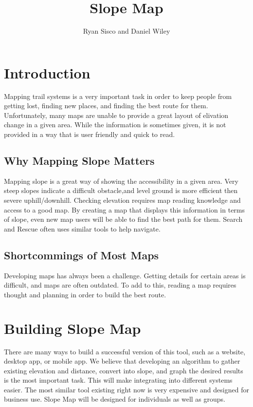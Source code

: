 \documentclass[12pt]{article}
\title{Slope Map}
\author{Ryan Sisco and Daniel Wiley}
\begin{document}
\maketitle
\tableofcontents



\section{Introduction}
Mapping trail systems is a very important task in order to keep people from getting lost, finding new places, and finding the best route for them. Unfortunately, many maps are unable to provide a great layout of elivation change in a given area. While the information is sometimes given, it is not provided in a way that is user friendly and quick to read.
\subsection{Why Mapping Slope Matters}
Mapping slope is a great way of showing the accessibility in a given area. Very steep slopes indicate a difficult obstacle,and level ground is more efficient then severe uphill/downhill\cite{Perrey:2007}. Checking elevation requires map reading knowledge and access to a good map. By creating a map that displays this information in terms of slope, even new map users will be able to find the best path for them. Search and Rescue often uses similar tools to help navigate\cite{Hurst:2017}\cite{Gabbert:2017}\cite{Pfau:2013}.
\subsection{Shortcommings of Most Maps}
Developing maps has always been a challenge. Getting details for certain areas is difficult, and maps are often outdated. To add to this, reading a map requires thought and planning in order to build the best route.

\section{Building Slope Map}
There are many ways to build a successful version of this tool, such as a website, desktop app, or mobile app. We believe that developing an algorithm to gather existing elevation and distance, convert into slope, and graph the desired results is the most important task. This will make integrating into different systems easier. The most similar tool existing right now is very expensive and designed for business use. Slope Map will be designed for individuals as well as groups.
\end{document}
